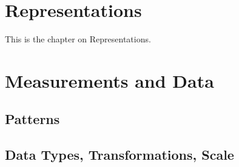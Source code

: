 \documentclass[MachineLearning]{subfiles}
\begin{document}
\section{Representations}

This is the chapter on Representations.

\section{Measurements and Data}
\subsection{Patterns}
\subsection{Data Types, Transformations, Scale}
\end{document}
